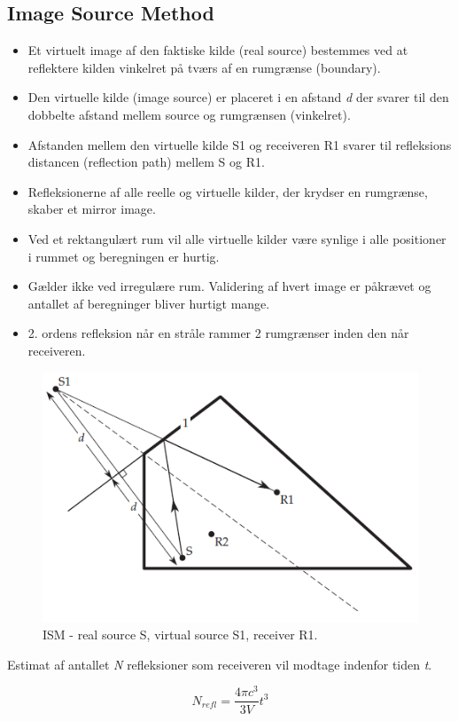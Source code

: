 \subsection{Image Source Method}
\begin{itemize}
	\item Et virtuelt image af den faktiske kilde (real source) bestemmes ved at reflektere kilden vinkelret på tværs af en rumgrænse (boundary).
	\item Den virtuelle kilde (image source) er placeret i en afstand \textit{d} der svarer til den dobbelte afstand mellem source og rumgrænsen (vinkelret).
	\item Afstanden mellem den virtuelle kilde S1 og receiveren R1 svarer til refleksions distancen (reflection path) mellem S og R1.
	\item Refleksionerne af alle reelle og virtuelle kilder, der krydser en rumgrænse, skaber et mirror image.
	\item Ved et rektangulært rum vil alle virtuelle kilder være synlige i alle positioner i rummet og beregningen er hurtig.
	\item Gælder ikke ved irregulære rum. Validering af hvert image er påkrævet og antallet af beregninger bliver hurtigt mange.
	\item 2. ordens refleksion når en stråle rammer 2 rumgrænser inden den når receiveren.
\end{itemize}

\begin{figure} [H]
	\centering
	\includegraphics[width=.75\linewidth]{graphics/18.png}
	\caption{ISM - real source S, virtual source S1, receiver R1.}
	\label{fig:18}
\end{figure}

\noindent Estimat af antallet \textit{N} refleksioner som receiveren vil modtage indenfor tiden \textit{t}.

\begin{equation}
N_{refl}=\dfrac{4\pi c^3}{3V}t^3
\end{equation}

